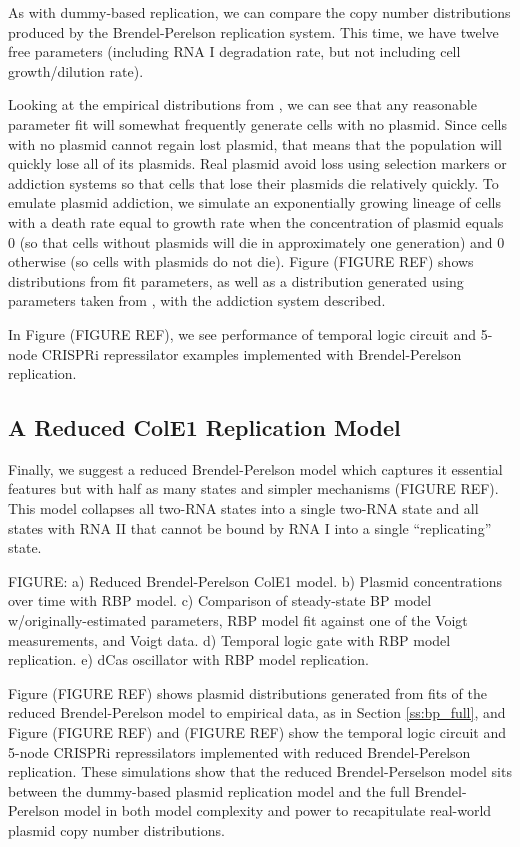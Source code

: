 \documentclass[preprint,12pt]{elsarticle}
\begin{document}
As with dummy-based replication, we can compare the copy number distributions produced by the Brendel-Perelson replication system. This time, we have twelve free parameters (including RNA I degradation rate, but not including cell growth/dilution rate). 

Looking at the empirical distributions from \cite{Shao2021}, we can see that any reasonable parameter fit will somewhat frequently generate cells with no plasmid. Since cells with no plasmid cannot regain lost plasmid, that means that the population will quickly lose all of its plasmids. Real plasmid avoid loss using selection markers or addiction systems so that cells that lose their plasmids die relatively quickly. To emulate plasmid addiction, we simulate an exponentially growing lineage of cells with a death rate equal to growth rate when the concentration of plasmid equals 0 (so that cells without plasmids will die in approximately one generation) and 0 otherwise (so cells with plasmids do not die). Figure (FIGURE REF) shows distributions from fit parameters, as well as a distribution generated using parameters taken from \cite{Brendel1993}, with the addiction system described.
 
In Figure (FIGURE REF), we see performance of temporal logic circuit and 5-node CRISPRi repressilator examples implemented with Brendel-Perelson replication. 

\subsection{A Reduced ColE1 Replication Model}

Finally, we suggest a reduced Brendel-Perelson model which captures it essential features but with half as many states and simpler mechanisms (FIGURE REF). This model collapses all two-RNA states into a single two-RNA state and all states with RNA II that cannot be bound by RNA I into a single ``replicating'' state. 

\vspace{.5in}
FIGURE: a) Reduced Brendel-Perelson ColE1 model. b) Plasmid concentrations over time with RBP model. c) Comparison of steady-state BP model w/originally-estimated parameters, RBP model fit against one of the Voigt measurements, and Voigt data. d) Temporal logic gate with RBP model replication. e) dCas oscillator with RBP model replication. 
\vspace{.5in} 

Figure (FIGURE REF) shows plasmid distributions generated from fits of the reduced Brendel-Perelson model to empirical data, as in Section \ref{ss:bp_full}, and Figure (FIGURE REF) and (FIGURE REF) show the temporal logic circuit and 5-node CRISPRi repressilators implemented with reduced Brendel-Perelson replication. These simulations show that the reduced Brendel-Perselson model sits between the dummy-based plasmid replication model and the full Brendel-Perelson model in both model complexity and power to recapitulate real-world plasmid copy number distributions. 
\end{document}
